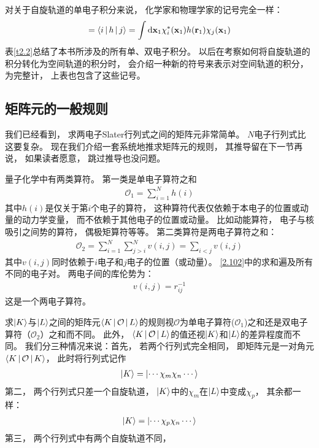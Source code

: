 对关于自旋轨道的单电子积分来说，
化学家和物理学家的记号完全一样：
\begin{align}
[i|h|j]=\braket{i|h|j}=\int\ddx_1\chi_i^*(\bo{x}_1)h(\bo{r}_1)\chi_j(\bo{x}_1)
\end{align}
表\ref{t2.2}总结了本书所涉及的所有单、双电子积分。
以后在考察如何将自旋轨道的积分转化为空间轨道的积分时，
会介绍一种新的符号来表示对空间轨道的积分，
为完整计，
上表也包含了这些记号。



\subsection{矩阵元的一般规则}
\label{sec2.3.3}
我们已经看到，
求两电子Slater行列式之间的矩阵元非常简单。
$N$电子行列式比这要复杂。
现在我们介绍一套系统地推求矩阵元的规则，
其推导留在下一节再说，
如果读者愿意，
跳过推导也没问题。


量子化学中有两类算符。
第一类是单电子算符之和
\begin{align}
\mathcal{O}_1=\sum_{i=1}^N h(i)
\end{align}
其中$h(i)$是仅关于第$i$个电子的算符，
这种算符代表仅依赖于本电子的位置或动量的动力学变量，
而不依赖于其他电子的位置或动量。
比如动能算符，
电子与核吸引之间势的算符，
偶极矩算符等等。
第二类算符是两电子算符之和：
\begin{align}
\label{2.102}
\mathcal{O}_2 = \sum_{i=1}^{N}\sum_{j>i}^N v(i,j)=\sum_{i<j}v(i,j)
\end{align}
其中$v(i,j)$同时依赖于$i$电子和$j$电子的位置（或动量）。
\ref{2.102}中的求和遍及所有不同的电子对。
两电子间的库伦势为：
\begin{align}
v(i,j)=r_{ij}^{-1}
\end{align}
这是一个两电子算符。


求$\Ket{K}$与$\Ket{L}$之间的矩阵元$\Braket{K|\mathcal{O}|L}$的规则视$\mathcal{O}$为单电子算符($\mathcal{O}_1$)之和还是双电子算符（$\mathcal{O}_2$）之和而不同。
此外，
$\Braket{K|\mathcal{O}|L}$的值还视$\Ket{K}$和$\Ket{L}$的差异程度而不同。
我们分三种情况来说：首先，
若两个行列式完全相同，
即矩阵元是一对角元$\Braket{K|\mathcal{O}|K}$，
此时将行列式记作
\begin{align}
\Ket{K}=\Ket{\cdots\chi_m\chi_n\cdots}
\end{align}
第二，
两个行列式只差一个自旋轨道，
$\Ket{K}$中的$\chi_m$在$\Ket{L}$中变成$\chi_p$，
其余都一样：
\begin{align}
\Ket{K}=\Ket{\cdots\chi_p\chi_n\cdots}
\end{align}
第三，
两个行列式中有两个自旋轨道不同，

